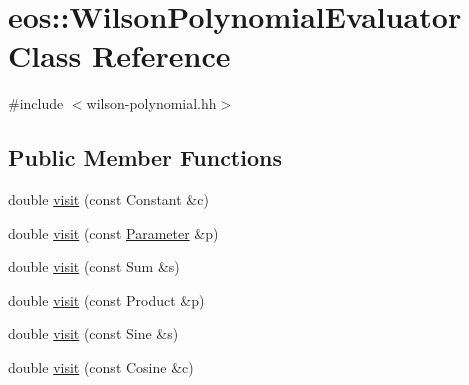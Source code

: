 \hypertarget{classeos_1_1WilsonPolynomialEvaluator}{
\section{eos::WilsonPolynomialEvaluator Class Reference}
\label{classeos_1_1WilsonPolynomialEvaluator}
}


{\ttfamily \#include $<$wilson-\/polynomial.hh$>$}\subsection*{Public Member Functions}
\begin{DoxyCompactItemize}
\item 
double \hyperlink{classeos_1_1WilsonPolynomialEvaluator_ac85d91d12ce34c628012f7e4ee451359}{visit} (const Constant \&c)
\item 
double \hyperlink{classeos_1_1WilsonPolynomialEvaluator_a380ced036f68d89cdf3edde705a32813}{visit} (const \hyperlink{classeos_1_1Parameter}{Parameter} \&p)
\item 
double \hyperlink{classeos_1_1WilsonPolynomialEvaluator_a9c91165808b2aee3c8a0db64a99f5c7c}{visit} (const Sum \&s)
\item 
double \hyperlink{classeos_1_1WilsonPolynomialEvaluator_a4fe1a704b1c709430263aded5340edea}{visit} (const Product \&p)
\item 
double \hyperlink{classeos_1_1WilsonPolynomialEvaluator_ac428812e088c1162538afa2295575254}{visit} (const Sine \&s)
\item 
double \hyperlink{classeos_1_1WilsonPolynomialEvaluator_aa2c20db0637cbd2ad4a4ca278e0f0dc8}{visit} (const Cosine \&c)
\end{DoxyCompactItemize}


